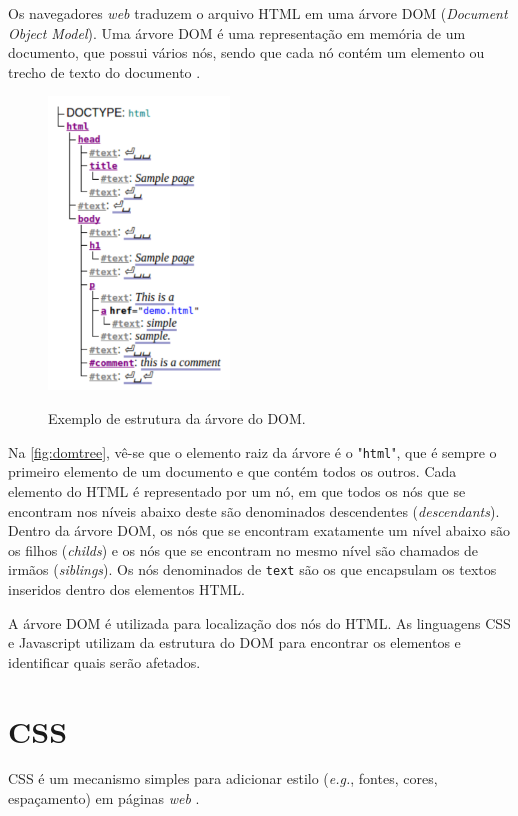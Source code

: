 Os navegadores \textit{web} traduzem o arquivo HTML em uma árvore DOM (\textit{Document Object Model}). Uma árvore DOM é uma representação em memória de um documento, que possui vários nós, sendo que cada nó contém um elemento ou trecho de texto do documento \cite{HTMLspec2014}.

\begin{figure}[!htb]
	\centering
	\caption{Exemplo de estrutura da árvore do DOM.}
	\includegraphics[width=0.43\textwidth]{./04-figuras/DOMsnippet}
	\label{fig:domtree}
\end{figure}

Na \autoref{fig:domtree}, vê-se que o elemento raiz da árvore é o "\texttt{html}", que é sempre o primeiro elemento de um documento e que contém todos os outros. Cada elemento do HTML é representado por um nó, em que todos os nós que se encontram nos níveis abaixo deste são denominados descendentes (\textit{descendants}). Dentro da árvore DOM, os nós que se encontram exatamente um nível abaixo são os filhos (\textit{childs}) e os nós que se encontram no mesmo nível são chamados de irmãos (\textit{siblings}). Os nós denominados de \texttt{text} são os que encapsulam os textos inseridos dentro dos elementos HTML.

A árvore DOM é utilizada para localização dos nós do HTML. As linguagens  CSS e Javascript utilizam da estrutura do DOM para encontrar os elementos e identificar quais serão afetados.

\section{CSS}
\label{sec:CSS}
CSS é um mecanismo simples para adicionar estilo (\textit{e.g.}, fontes, cores, espaçamento) em páginas \textit{web} \cite{W3Ccss2015}.

